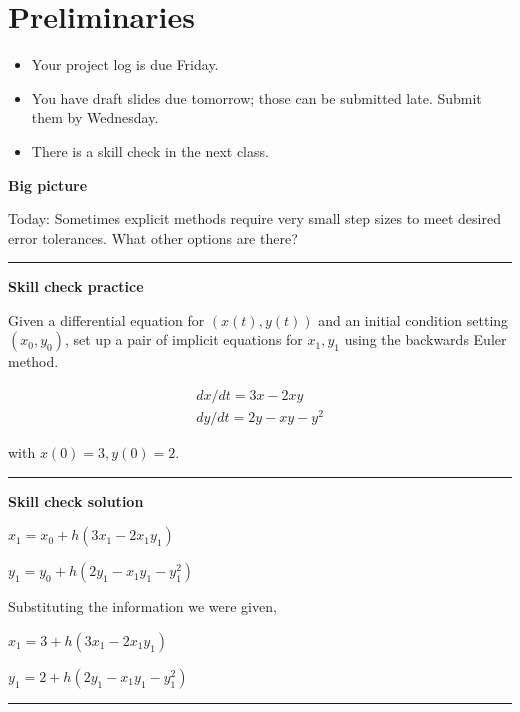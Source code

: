 \documentclass[12pt,letterpaper,noanswers]{exam}
\begin{document}
 \pdfpageheight 11in 
  \pdfpagewidth 8.5in

\noindent 

\section*{Preliminaries}

\begin{itemize}
\itemsep0pt
\item Your project log is due Friday.
\item You have draft slides due tomorrow; those can be submitted late.  Submit them by Wednesday.
\item There is a skill check in the next class.
\end{itemize}


\noindent\textbf{Big picture}

Today: Sometimes explicit methods require very small step sizes to meet desired error tolerances.  What other options are there?

\vspace{0.2cm}
\hrule
\vspace{0.2cm}

\noindent \textbf{Skill check practice}

Given a differential equation for $(x(t),y(t))$ and an initial condition setting $(x_0,y_0)$, set up a pair of implicit equations for $x_1, y_1$ using the backwards Euler method.

\[\displaystyle\begin{array}{l} dx/dt = 3x - 2xy \\
dy/dt= 2y - xy - y^2 \end{array}\]

with $x(0) = 3, y(0) = 2$.

\vspace{0.2cm}
\hrule
\vspace{0.2cm}

\noindent \textbf{Skill check solution}

$x_1 = x_0 + h (3x_1 - 2x_1 y_1)$


$y_1 = y_0 + h (2y_1 - x_1 y_1 - y_1^2)$

Substituting the information we were given,

$x_1 = 3 + h (3x_1 - 2x_1 y_1)$


$y_1 = 2 + h (2y_1 - x_1 y_1 - y_1^2)$




\vspace{0.2cm}
\hrule
\vspace{0.2cm}
\end{document}
